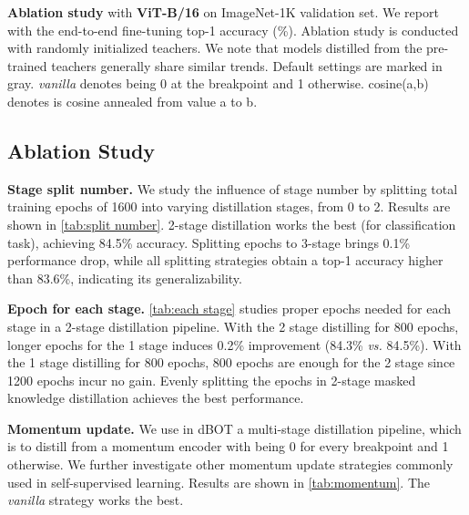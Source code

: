 \documentclass[10pt,twocolumn,letterpaper]{article}
\renewcommand{\paragraph}[1]{\vspace{1.25mm}\noindent\textbf{#1}}
\def\ourmethod{{dBOT}\xspace}
\begin{document}
\begin{table*}[!ht]
\begin{center}
{}
\vspace{-.4em}
\end{center}
\caption{\textbf{Ablation study} with \textbf{ViT-B/16} on ImageNet-1K validation set. We report with the end-to-end fine-tuning top-1 accuracy (\%).
Ablation study is conducted with randomly initialized teachers. We note that models distilled from the pre-trained teachers generally share similar trends.
Default settings are marked in \colorbox{baselinecolor}{gray}.
\textit{vanilla} denotes  being 0 at the breakpoint and 1 otherwise.
cosine(a,b) denotes  is cosine annealed from value a to b.
}
\label{tab:ablations} \vspace{-.5em}
\end{table*}




\subsection{Ablation Study}

\paragraph{Stage split number.}
We study the influence of stage number by splitting total training epochs of 1600 into varying distillation stages, from 0 to 2.
Results are shown in \cref{tab:split number}. 
2-stage distillation works the best (for classification task), achieving 84.5\% accuracy.
Splitting epochs to 3-stage brings 0.1\% performance drop,
while all splitting strategies obtain a top-1 accuracy higher than 83.6\%, indicating its generalizability.

\paragraph{Epoch for each stage.}
\cref{tab:each stage} studies proper epochs needed for each stage in a 2-stage distillation pipeline. 
With the 2 stage distilling for 800 epochs, longer epochs for the 1 stage induces 0.2\% improvement (84.3\% \textit{vs.} 84.5\%).
With the 1 stage distilling for 800 epochs, 800 epochs are enough for the 2 stage since 1200 epochs incur no gain.
Evenly splitting the epochs in 2-stage masked knowledge distillation achieves the best performance.

\paragraph{Momentum update.}
We use in \ourmethod a multi-stage distillation pipeline, which is to distill from a momentum encoder with  being 0 for every breakpoint and 1 otherwise. 
We further investigate other momentum update strategies commonly used in self-supervised learning.
Results are shown in \cref{tab:momentum}.
The \textit{vanilla} strategy works the best.
\end{document}
